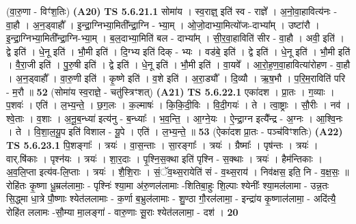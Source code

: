 \documentclass[17pt]{extarticle}
\begin{document}
                  \newline
                      (वा॒रु॒णा - विꣳ॑श॒तिः)  \textbf{(A20)} \newline \newline
                                \textbf{ TS 5.6.21.1} \newline
                  सोमा॑य । स्व॒राज्ञ्॒ इति॑ स्व - राज्ञे᳚ । अ॒नो॒वा॒हावित्य॑नः - वा॒हौ । अ॒न॒ड्वाहौ᳚ । इ॒न्द्रा॒ग्निभ्या॒मिती᳚न्द्रा॒ग्नि - भ्या॒म् । ओ॒जो॒दाभ्या॒मित्यो॑जः-दाभ्या᳚म् । उष्टा॑रौ । इ॒न्द्रा॒ग्निभ्या॒मिती᳚न्द्रा॒ग्नि-भ्या॒म् । ब॒ल॒दाभ्या॒मिति॑ बल - दाभ्या᳚म् । सी॒र॒वा॒हाविति॑ सीर - वा॒हौ । अवी॒ इति॑ । द्वे इति॑ । धे॒नू इति॑ । भौ॒मी इति॑ । दि॒ग्भ्य इति॑ दिक् - भ्यः । वड॑बे॒ इति॑ । द्वे इति॑ । धे॒नू इति॑ । भौ॒मी इति॑ । वै॒रा॒जी इति॑ । पु॒रु॒षी इति॑ । द्वे इति॑ । धे॒नू इति॑ । भौ॒मी इति॑ । वा॒यवे᳚ । आ॒रो॒ह॒ण॒वा॒हावित्या॑रोहण - वा॒हौ । अ॒न॒ड्वाहौ᳚ । वा॒रु॒णी इति॑ । कृ॒ष्णे इति॑ । व॒शे इति॑ । अ॒रा॒ड्यौ᳚ । दि॒व्यौ । ऋ॒ष॒भौ । प॒रि॒म॒राविति॑ परि - म॒रौ ॥ \textbf{  52 } \newline
                  \newline
                      (सोमा॑य स्व॒राज्ञे॒ - चतु॑स्त्रिꣳशत्)  \textbf{(A21)} \newline \newline
                                \textbf{ TS 5.6.22.1} \newline
                  एका॑दश । प्रा॒तः । ग॒व्याः । प॒शवः॑ । एति॑ । ल॒भ्य॒न्ते॒ । छ॒ग॒लः । क॒ल्माषः॑ । कि॒कि॒दी॒विः । वि॒दी॒गयः॑ । ते । त्वा॒ष्ट्राः । सौ॒रीः । नव॑ । श्वे॒ताः । व॒शाः । अ॒नू॒ब॒न्ध्या॑ इत्य॑नु - ब॒न्ध्याः᳚ । भ॒व॒न्ति॒ । आ॒ग्ने॒यः । ऐ॒न्द्रा॒ग्न इत्यै᳚न्द्र - अ॒ग्नः । आ॒श्वि॒नः । ते । वि॒शा॒ल॒यू॒प इति॑ विशाल - यू॒पे । एति॑ । ल॒भ्य॒न्ते॒ ॥ \textbf{  53} \newline
                  \newline
                      (ऐका॑दश प्रा॒तः - पञ्च॑विꣳशतिः)  \textbf{(A22)} \newline \newline
                                \textbf{ TS 5.6.23.1} \newline
                  पि॒शङ्गाः᳚ । त्रयः॑ । वा॒स॒न्ताः । सा॒रङ्गाः᳚ । त्रयः॑ । ग्रैष्माः᳚ । पृष॑न्तः । त्रयः॑ । वार्.षि॑काः । पृश्न॑यः । त्रयः॑ । शा॒र॒दाः । पृ॒श्नि॒स॒क्था इति॑ पृश्नि - स॒क्थाः । त्रयः॑ । हैम॑न्तिकाः । अ॒व॒लि॒प्ता इत्य॑व-लि॒प्ताः । त्रयः॑ । शै॒शि॒राः । सं॒ॅव॒थ्स॒रायेति॑ सं - व॒थ्स॒राय॑ । निव॑क्षस॒ इति॒ नि - व॒क्ष॒सः॒ ॥रोहि॑तः कृ॒ष्णा धू॒म्रल॑लामाः॒ - पृश्निः॑ श्या॒मा अ॑रु॒णल॑लामाः -शितिबा॒हुः शि॒ल्पाः श्येनीः᳚ श्या॒मल॑लामा - उन्न॒तः सि॒द्ध्मा धा॒त्रे पौ॒ष्णाः श्येत॑ललामाः - क॒र्णा ब॒भ्रुल॑लामाः - शु॒ण्ठा गौ॒रल॑लामा॒ - इन्द्रा॑य कृ॒ष्णाल॑लामा॒ - अदि॑त्यै॒ रोहि॑त ललामः -सौ॒म्या मा॒लङ्गा॑ - वारु॒णाः सू॒राः श्येत॑ललामा॒ - दश॑ । \textbf{  20 } \newline
\end{document}
